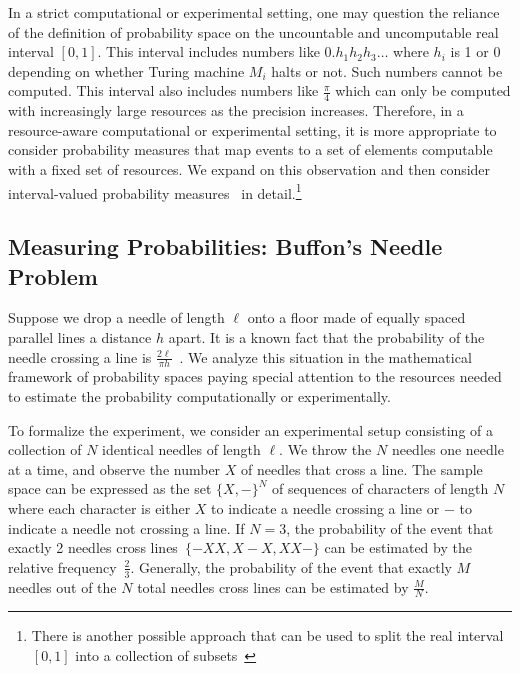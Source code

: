 \documentclass{article}
\theoremstyle{remark}
\newcommand{\yutsung}[1]{\fbox{\begin{minipage}{0.9\textwidth}\color{purple}{Yu-Tsung says: #1}\end{minipage}}}
\newcommand{\amr}[1]{\fbox{\begin{minipage}{0.9\textwidth}\color{green}{Amr says: #1}\end{minipage}}}
\begin{document}
In a strict computational or experimental setting, one may question
the reliance of the definition of probability space on the uncountable
and uncomputable real interval $[0,1]$. This interval includes numbers
like $0.h_1h_2h_3\ldots$ where $h_i$ is 1 or 0 depending on whether
Turing machine $M_i$ halts or not. Such numbers cannot be
computed. This interval also includes numbers like $\frac{\pi}{4}$
which can only be computed with increasingly large resources as the
precision increases.
Therefore, in a resource-aware computational or experimental setting,
it is more appropriate to consider probability measures that map
events to a set of elements computable with a fixed set of
resources. We expand on this observation and then consider
interval-valued probability
measures~\cite{Dempster1967,Zadeh1986,Weichselberger2000,JamisonLodwick2004}
in detail.\footnote{There is another possible approach that can be
  used to split the real interval $[0,1]$ into a collection of
  subsets~\cite{Artstein1972,PuriRalescu1983} \amr{need to explain the
    connection and why we are not using it.}}

\subsection{Measuring Probabilities: Buffon's Needle Problem}
 
Suppose we drop a needle of length $\ell$ onto a floor made of equally
spaced parallel lines a distance $h$ apart. It is a known fact that
the probability of the needle crossing a line is
$\frac{2\ell}{\pi h}$~\cite{Buffon1777,DeMorgan1872,Hall1873,Uspensky1937}.
We analyze this situation in the mathematical framework of probability
spaces paying special attention to the resources needed to estimate
the probability computationally or experimentally.

To formalize the experiment, we consider an experimental setup
consisting of a collection of $N$ identical needles of length
$\ell$. We throw the $N$ needles one needle at a time, and observe the number
$X$ of needles that cross a line. The sample space can be expressed as the set
$\{X,-\}^N$
of sequences of characters of length $N$ where each character is
either $X$ to indicate a needle crossing a line or $-$ to indicate a
needle not crossing a line. If $N=3$, the probability of the event that exactly
2 needles cross lines~$\{-XX,X-X,XX-\}$ can be 
estimated by the relative frequency~$\frac{2}{3}$. Generally, the probability of
the event that exactly $M$ needles out of the $N$ total needles cross lines can
be estimated by $\frac{M}{N}$.
\end{document}
